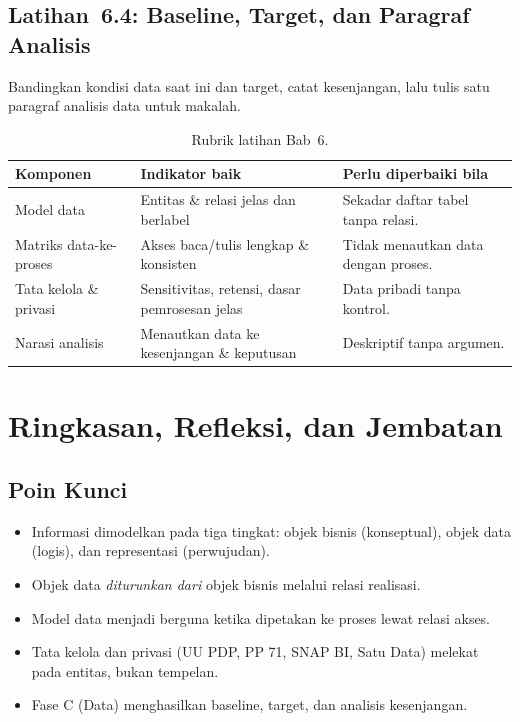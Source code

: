 \subsection*{Latihan~6.4: Baseline, Target, dan Paragraf Analisis}
Bandingkan kondisi data saat ini dan target, catat kesenjangan, lalu tulis satu
paragraf analisis data untuk makalah.

\begin{table}[htbp]
\centering
\scriptsize
\caption{Rubrik latihan Bab~6.}
\label{tab:rubrik-bab5-data}
\begin{tabularx}{\textwidth}{@{}p{} X X@{}}
\hline
\textbf{Komponen} & \textbf{Indikator baik} & \textbf{Perlu diperbaiki bila} \\
\hline
Model data & Entitas \& relasi jelas dan berlabel & Sekadar daftar tabel tanpa
relasi. \\
Matriks data-ke-proses & Akses baca/tulis lengkap \& konsisten & Tidak menautkan
data dengan proses. \\
Tata kelola \& privasi & Sensitivitas, retensi, dasar pemrosesan jelas & Data
pribadi tanpa kontrol. \\
Narasi analisis & Menautkan data ke kesenjangan \& keputusan & Deskriptif tanpa
argumen. \\
\hline
\end{tabularx}
\end{table}

\section{Ringkasan, Refleksi, dan Jembatan}

\subsection*{Poin Kunci}
\begin{itemize}
  \item Informasi dimodelkan pada tiga tingkat: objek bisnis (konseptual), objek
        data (logis), dan representasi (perwujudan).
  \item Objek data \emph{diturunkan dari} objek bisnis melalui relasi realisasi.
  \item Model data menjadi berguna ketika dipetakan ke proses lewat relasi akses.
  \item Tata kelola dan privasi (UU PDP, PP 71, SNAP BI, Satu Data) melekat pada
        entitas, bukan tempelan.
  \item Fase C (Data) menghasilkan baseline, target, dan analisis kesenjangan.
\end{itemize}

